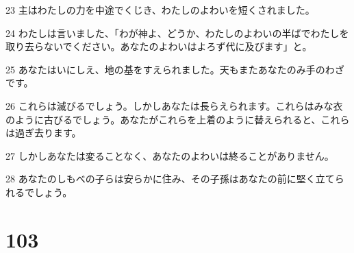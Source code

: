 \par 23 主はわたしの力を中途でくじき、わたしのよわいを短くされました。
\par 24 わたしは言いました、「わが神よ、どうか、わたしのよわいの半ばでわたしを取り去らないでください。あなたのよわいはよろず代に及びます」と。
\par 25 あなたはいにしえ、地の基をすえられました。天もまたあなたのみ手のわざです。
\par 26 これらは滅びるでしょう。しかしあなたは長らえられます。これらはみな衣のように古びるでしょう。あなたがこれらを上着のように替えられると、これらは過ぎ去ります。
\par 27 しかしあなたは変ることなく、あなたのよわいは終ることがありません。
\par 28 あなたのしもべの子らは安らかに住み、その子孫はあなたの前に堅く立てられるでしょう。

\chapter{103}

